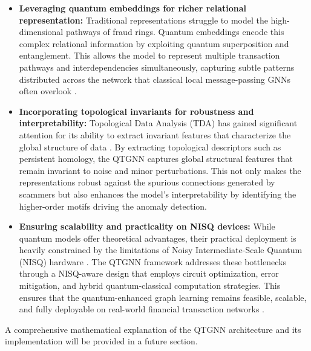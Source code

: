\begin{itemize}
    \item \textbf{Leveraging quantum embeddings for richer relational representation:} Traditional representations struggle to model the high-dimensional pathways of fraud rings. Quantum embeddings encode this complex relational information by exploiting quantum superposition and entanglement. This allows the model to represent multiple transaction pathways and interdependencies simultaneously, capturing subtle patterns distributed across the network that classical local message-passing GNNs often overlook \cite{mainarticle}.
    
    \item \textbf{Incorporating topological invariants for robustness and interpretability:} Topological Data Analysis (TDA) has gained significant attention for its ability to extract invariant features that characterize the global structure of data \cite{monkam2024}. By extracting topological descriptors such as persistent homology, the QTGNN captures global structural features that remain invariant to noise and minor perturbations. This not only makes the representations robust against the spurious connections generated by scammers but also enhances the model's interpretability by identifying the higher-order motifs driving the anomaly detection.
    
    \item \textbf{Ensuring scalability and practicality on NISQ devices:} While quantum models offer theoretical advantages, their practical deployment is heavily constrained by the limitations of Noisy Intermediate-Scale Quantum (NISQ) hardware \cite{umeda2019}. The QTGNN framework addresses these bottlenecks through a NISQ-aware design that employs circuit optimization, error mitigation, and hybrid quantum-classical computation strategies. This ensures that the quantum-enhanced graph learning remains feasible, scalable, and fully deployable on real-world financial transaction networks \cite{mainarticle}.
\end{itemize}

A comprehensive mathematical explanation of the QTGNN architecture and its implementation will be provided in a future section.